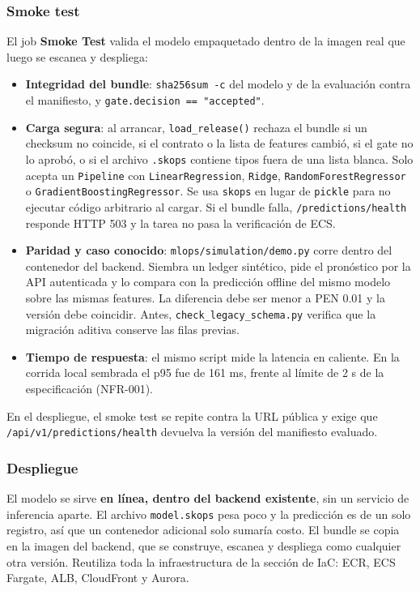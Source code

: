 \subsubsection{Smoke test}

El job \textbf{Smoke Test} valida el modelo empaquetado dentro de la imagen real que luego se escanea y despliega:

\begin{itemize}
    \item \textbf{Integridad del bundle}: \texttt{sha256sum -c} del modelo y de la evaluación contra el manifiesto, y \texttt{gate.decision == "accepted"}.
    \item \textbf{Carga segura}: al arrancar, \texttt{load\_release()} rechaza el bundle si un checksum no coincide, si el contrato o la lista de features cambió, si el gate no lo aprobó, o si el archivo \texttt{.skops} contiene tipos fuera de una lista blanca. Solo acepta un \texttt{Pipeline} con \texttt{LinearRegression}, \texttt{Ridge}, \texttt{RandomForestRegressor} o \texttt{GradientBoostingRegressor}. Se usa \texttt{skops} en lugar de \texttt{pickle} para no ejecutar código arbitrario al cargar. Si el bundle falla, \texttt{/predictions/health} responde HTTP 503 y la tarea no pasa la verificación de ECS.
    \item \textbf{Paridad y caso conocido}: \texttt{mlops/simulation/demo.py} corre dentro del contenedor del backend. Siembra un ledger sintético, pide el pronóstico por la API autenticada y lo compara con la predicción offline del mismo modelo sobre las mismas features. La diferencia debe ser menor a PEN 0.01 y la versión debe coincidir. Antes, \texttt{check\_legacy\_schema.py} verifica que la migración aditiva conserve las filas previas.
    \item \textbf{Tiempo de respuesta}: el mismo script mide la latencia en caliente. En la corrida local sembrada el p95 fue de 161 ms, frente al límite de 2 s de la especificación (NFR-001).
\end{itemize}

En el despliegue, el smoke test se repite contra la URL pública y exige que \texttt{/api/v1/predictions/health} devuelva la versión del manifiesto evaluado.

\subsubsection{Despliegue}

El modelo se sirve \textbf{en línea, dentro del backend existente}, sin un servicio de inferencia aparte. El archivo \texttt{model.skops} pesa poco y la predicción es de un solo registro, así que un contenedor adicional solo sumaría costo. El bundle se copia en la imagen del backend, que se construye, escanea y despliega como cualquier otra versión. Reutiliza toda la infraestructura de la sección de IaC: ECR, ECS Fargate, ALB, CloudFront y Aurora.

